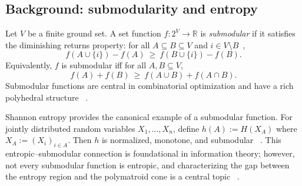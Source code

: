 \documentclass[conference]{IEEEtran}
\theoremstyle{definition}
\theoremstyle{remark}
\begin{document}
\subsection{Background: submodularity and entropy}
Let $V$ be a finite ground set. A set function $f:2^V\to \mathbb{R}$ is \emph{submodular} if it satisfies the
diminishing returns property: for all $A\subseteq B\subseteq V$ and $i\in V\setminus B$~\cite{Fujishige2005,bilmes2022submodularity},
\begin{equation}
f(A\cup\{i\})-f(A)\ \ge\ f(B\cup\{i\})-f(B).
\label{eq:dr_submod}
\end{equation}
Equivalently, $f$ is submodular iff for all $A,B\subseteq V$,
\begin{equation}
f(A)+f(B)\ \ge\ f(A\cup B)+f(A\cap B).
\label{eq:submod_lattice}
\end{equation}
Submodular functions are central in combinatorial optimization and have a rich polyhedral structure
~\cite{Edmonds1970,Fujishige2005,Schrijver2003,bilmes2022submodularity,iyer2015polyhedral}.

Shannon entropy provides the canonical example of a submodular function.
For jointly distributed random variables $X_1,\ldots,X_n$, define $h(A):=H(X_A)$ where
$X_A := (X_i)_{i\in A}$. Then $h$ is normalized, monotone, and submodular ~\cite{Shannon1948,Yeung2008}.
This entropic--submodular connection is foundational in information theory; however, not every submodular function
is entropic, and characterizing the gap between the entropy region and the polymatroid cone is a central topic
~\cite{ZhangYeung1997,ZhangYeung1998,DoughertyFreilingZeger2011,Matus2013AlmostEntropic}.
\end{document}
